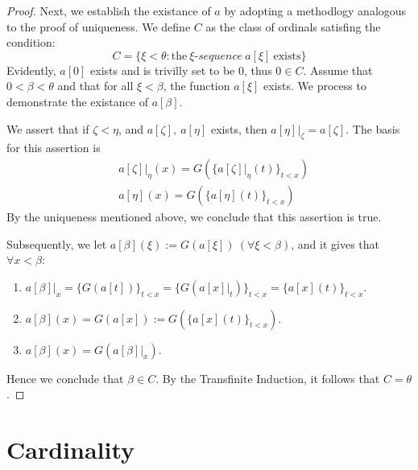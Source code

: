 \begin{proof}
  Next, we establish the existance of $a$ by adopting a methodlogy analogous to the proof of uniqueness. We define $C$ as the class of ordinals satisfing the condition:
  \begin{equation*}
    C = \{ \xi < \theta: \text{the}\ \xi \mbox{-} sequence \ a[\xi] \ \text{exists} \}
  \end{equation*}
  Evidently, $a[0]$ exists and is trivilly set to be $0$, thus $0 \in C$. Assume that $0 < \beta < \theta$ and that for all $\xi < \beta$, the function $a[\xi]$ exists. We process to demonstrate the existance of $a[\beta]$.

  We assert that if $\zeta < \eta$, and $a[\zeta], \ a[\eta]$ exists, then $a[\eta]|_{\zeta} = a[\zeta]$. The basis for this assertion is
  \begin{align*}
    & a[\zeta]|_{\eta}(x) = G(\{ a[\zeta]|_{\eta} (t) \}_{t < x}) \\
    & a[\eta] (x) = G(\{ a[\eta](t) \}_{t< x})
  \end{align*}
  By the uniqueness mentioned above, we conclude that this assertion is true.

  Subsequently, we let $a[\beta](\xi) := G(a[\xi]) \ (\forall \xi < \beta)$, and it gives that $\forall x < \beta$: 
  \begin{enumerate}
    \item $a[\beta]|_{x} = \{ G(a[t]) \}_{t < x} = \{ G(a[x]|_{t}) \}_{t < x} = \{ a[x](t) \}_{t < x}$.
    \item $a[\beta](x) = G(a[x]) := G(\{ a[x](t) \}_{t < x})$.
    \item $a[\beta](x) = G(a[\beta]|_{x})$.
  \end{enumerate}
  Hence we conclude that $\beta \in C$. By the Transfinite Induction, it follows that $C = \theta$.
  
\end{proof}







\section{Cardinality}

